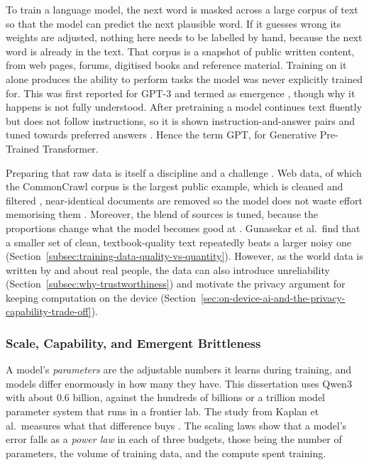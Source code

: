 To train a language model, the next word is masked across a large corpus of text so that the model can predict the next plausible word. If it guesses wrong its weights are adjusted, nothing here needs to be labelled by hand, because the next word is already in the text. That corpus is a snapshot of public written content, from web pages, forums, digitised books and reference material. Training on it alone produces the ability to perform tasks the model was never explicitly trained for. This was first reported for GPT-3 and termed as emergence \cite{brown2020languagemodelsfewshotlearners}, though why it happens is not fully understood. After pretraining a model continues text fluently but does not follow instructions, so it is shown instruction-and-answer pairs and tuned towards preferred answers \cite{wei2022finetunedlanguagemodelszeroshot}. Hence the term GPT, for Generative Pre-Trained Transformer.

Preparing that raw data is itself a discipline and a challenge \cite{liang2026nextgenerationllmtrainingdatacentric}. Web data, of which the CommonCrawl corpus is the largest public example, which is cleaned and filtered \cite{commoncrawl, raffel2023exploringlimitstransferlearning, penedo2024finewebdatasetsdecantingweb}, near-identical documents are removed so the model does not waste effort memorising them \cite{lee2022deduplicatingtrainingdatamakes}. Moreover, the blend of sources is tuned, because the proportions change what the model becomes good at \cite{xie2023doremioptimizingdatamixtures}. Gunasekar et al.\ find that a smaller set of clean, textbook-quality text repeatedly beats a larger noisy one \cite{gunasekar2023textbooksneed} (Section~\ref{subsec:training-data-quality-vs-quantity}). However, as the world data is written by and about real people, the data can also introduce unreliability (Section~\ref{subsec:why-trustworthiness}) and motivate the privacy argument for keeping computation on the device (Section~\ref{sec:on-device-ai-and-the-privacy-capability-trade-off}).

\subsubsection{Scale, Capability, and Emergent Brittleness}
\label{subsec:scale-capability}

A model's \emph{parameters} are the adjustable numbers it learns during training, and models differ enormously in how many they have. This dissertation uses Qwen3 with about 0.6 billion, against the hundreds of billions or a trillion model parameter system that runs in a frontier lab. The study from Kaplan et al.\ measures what that difference buys \cite{kaplan2020scalinglawsneurallanguage}. The scaling laws show that a model's error falls as a \emph{power law} in each of three budgets, those being the number of parameters, the volume of training data, and the compute spent training. 


